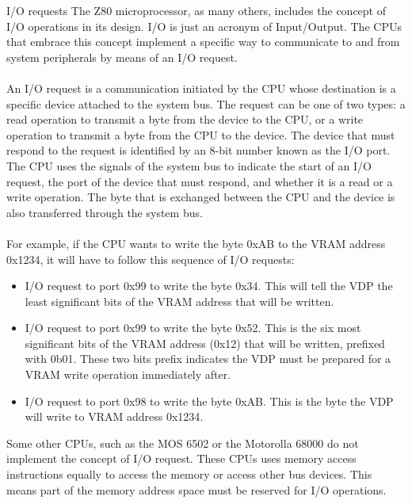 \begin{theory}{I/O requests}
	The Z80 microprocessor, as many others, includes the concept of I/O operations in its design. I/O is just an acronym of Input/Output. The CPUs that embrace this concept implement a specific way to communicate to and from system peripherals by means of an I/O request.\\\\ 
	
	An I/O request is a communication initiated by the CPU whose destination is a specific device attached to the system bus. The request can be one of two types: a read operation to transmit a byte from the device to the CPU, or a write operation to transmit a byte from the CPU to the device. The device that must respond to the request is identified by an 8-bit number known as the I/O port. The CPU uses the signals of the system bus to indicate the start of an I/O request, the port of the device that must respond, and whether it is a read or a write operation. The byte that is exchanged between the CPU and the device is also transferred through the system bus. \\\\
	
	For example, if the CPU wants to write the byte 0xAB to the VRAM address 0x1234, it will have to follow this sequence of I/O requests:
	
	\begin{itemize}
		\item I/O request to port 0x99 to write the byte 0x34. This will tell the VDP the least significant bits of the VRAM address that will be written.
		\item I/O request to port 0x99 to write the byte 0x52. This is the six most significant bits of the VRAM address (0x12) that will be written, prefixed with 0b01. These two bits prefix indicates the VDP must be prepared for a VRAM write operation immediately after.
		\item I/O request to port 0x98 to write the byte 0xAB. This is the byte the VDP will write to VRAM address 0x1234.
	\end{itemize}
	
	Some other CPUs, such as the MOS 6502 or the Motorolla 68000 do not implement the concept of I/O request. These CPUs uses memory access instructions equally to access the memory or access other bus devices. This means part of the memory address space must be  reserved for I/O operations. 	
\end{theory}


